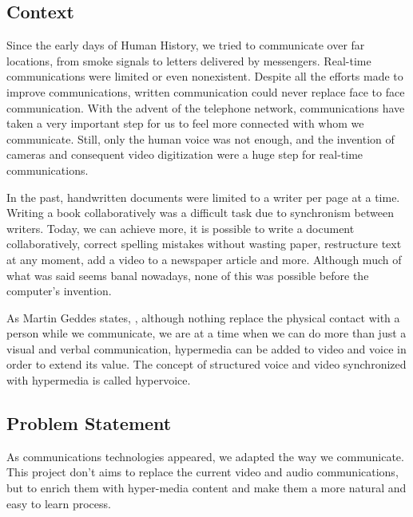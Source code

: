 \subsection{Context}   %
Since the early days of Human History, we tried to communicate over far locations, from smoke signals to letters delivered by messengers. Real-time communications were limited or even nonexistent. Despite all the efforts made to improve communications, written communication could never replace face to face communication.
With the advent of the telephone network, communications have taken a very important step for us to feel more connected with whom we communicate. Still, only the human voice was not enough, and the invention of cameras and consequent video digitization were a huge step for real-time communications.

	In the past, handwritten documents were limited to a writer per page at a time. Writing a book collaboratively was a difficult task due to synchronism between writers.
	Today, we can achieve more, it is possible to write a document collaboratively, correct spelling mistakes without wasting paper, restructure text at any moment, add a video to a newspaper article and more. Although much of what was said seems banal nowadays, none of this was possible before the computer's invention. 

	As Martin Geddes states\cite{geddes},  , although nothing replace the physical contact with a person while we communicate, we are at a time when we can do more than just a visual and verbal communication, hypermedia can be added to video and voice in order to extend its value. The concept of structured voice and video synchronized with hypermedia is called hypervoice.
        
\subsection{Problem Statement} %

	As communications technologies appeared, we adapted the way we communicate. This project don't aims to replace the current video and audio communications, but to enrich them with hyper-media content and make them a more natural and easy to learn process. 

